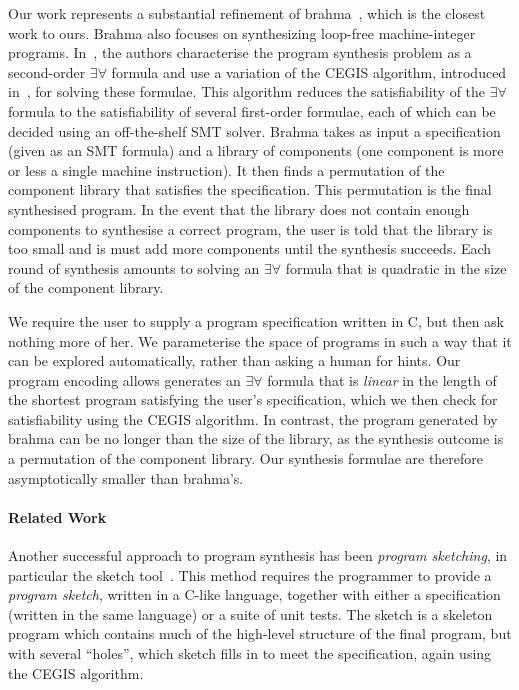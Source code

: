 \documentclass[a4paper]{llncs}
\begin{document}
Our work represents a substantial refinement of {\sc brahma}~\cite{brahma},
which is the closest work to ours.  {\sc Brahma} also focuses on
synthesizing loop-free machine-integer programs.  In~\cite{brahma}, the
authors characterise the program synthesis problem as a second-order
$\exists \forall$ formula and use a variation of the CEGIS algorithm,
introduced in~\cite{lezama-thesis}, for solving
these formulae.  This algorithm reduces the satisfiability of the $\exists
\forall$ formula to the satisfiability of several first-order formulae, each
of which can be decided using an off-the-shelf SMT solver.  {\sc Brahma}
takes as input a specification (given as an SMT formula) and a library of
components (one component is more or less a single machine instruction).  It
then finds a permutation of the component library that satisfies the
specification.  This permutation is the final synthesised program.  In the
event that the library does not contain enough components to synthesise a
correct program, the user is told that the library is too small and is
must add more components until the synthesis succeeds.  Each round of
synthesis amounts to solving an $\exists \forall$ formula that is quadratic
in the size of the component library.

We require the user to supply a program specification written in C, but then
ask nothing more of her.  We parameterise the space of programs in such a way
that it can be explored automatically, rather than asking a human for hints.
Our program encoding allows generates an $\exists
\forall$ formula that is \emph{linear} in the length of the shortest program
satisfying the user's specification, which we then check for satisfiability
using the CEGIS algorithm.  In contrast, the program generated by {\sc
brahma} can be no longer than the size of the library, as the synthesis
outcome is a permutation of the component library.  Our synthesis
formulae are therefore asymptotically smaller than {\sc brahma}'s.

\paragraph{Related Work}

Another successful approach to program synthesis has been \emph{program
sketching}, in particular the {\sc sketch} tool~\cite{lezama-thesis,sketch}.  This method
requires the programmer to provide a \emph{program sketch}, written in a
C-like language, together with either a specification (written in the same
language) or a suite of unit tests.  The sketch is a skeleton program which
contains much of the high-level structure of the final program, but with
several ``holes'', which {\sc sketch} fills in to meet the specification,
again using the CEGIS algorithm.
\end{document}
